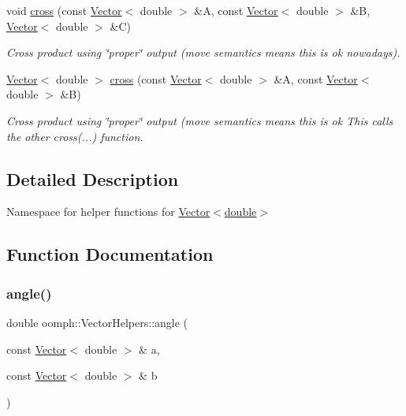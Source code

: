 \begin{DoxyCompactItemize}
void \hyperlink{namespaceoomph_1_1VectorHelpers_a462a66b178a1be39913a4b62c9d72eda}{cross} (const \hyperlink{classoomph_1_1Vector}{Vector}$<$ double $>$ \&A, const \hyperlink{classoomph_1_1Vector}{Vector}$<$ double $>$ \&B, \hyperlink{classoomph_1_1Vector}{Vector}$<$ double $>$ \&C)
\begin{DoxyCompactList}\small\item\em Cross product using \char`\"{}proper\char`\"{} output (move semantics means this is ok nowadays). \end{DoxyCompactList}\item 
\hyperlink{classoomph_1_1Vector}{Vector}$<$ double $>$ \hyperlink{namespaceoomph_1_1VectorHelpers_aa016aa8f2db73ad16bf65c218e5e0da2}{cross} (const \hyperlink{classoomph_1_1Vector}{Vector}$<$ double $>$ \&A, const \hyperlink{classoomph_1_1Vector}{Vector}$<$ double $>$ \&B)
\begin{DoxyCompactList}\small\item\em Cross product using \char`\"{}proper\char`\"{} output (move semantics means this is ok This calls the other cross(...) function. \end{DoxyCompactList}\end{DoxyCompactItemize}


\subsection{Detailed Description}
Namespace for helper functions for \hyperlink{classoomph_1_1Vector}{Vector$<$double$>$} 

\subsection{Function Documentation}
\mbox{\label{namespaceoomph_1_1VectorHelpers_aa1e3f6ce0472f978e750514448f8ca06}} 
\subsubsection{\texorpdfstring{angle()}{angle()}}
{\footnotesize\ttfamily double oomph\+::\+Vector\+Helpers\+::angle (\begin{DoxyParamCaption}\item[{const \hyperlink{classoomph_1_1Vector}{Vector}$<$ double $>$ \&}]{a,  }\item[{const \hyperlink{classoomph_1_1Vector}{Vector}$<$ double $>$ \&}]{b }\end{DoxyParamCaption})\hspace{0.3cm}{\ttfamily [inline]}}



